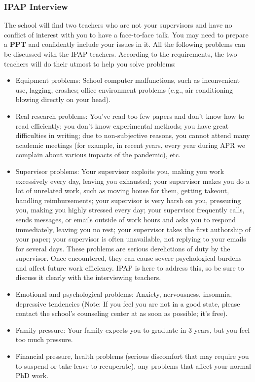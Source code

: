 \subsubsection{IPAP Interview}
\label{sec.IPAP}
The school will find two teachers who are not your supervisors and have no conflict of interest with you to have a face-to-face talk. You may need to prepare a \textbf{PPT} and confidently include your issues in it. All the following problems can be discussed with the IPAP teachers. According to the requirements, the two teachers will do their utmost to help you solve problems:
\begin{itemize}
    \item Equipment problems: School computer malfunctions, such as inconvenient use, lagging, crashes; office environment problems (e.g., air conditioning blowing directly on your head).
    \item Real research problems: You've read too few papers and don't know how to read efficiently; you don't know experimental methods; you have great difficulties in writing; due to non-subjective reasons, you cannot attend many academic meetings (for example, in recent years, every year during APR we complain about various impacts of the pandemic), etc.
    \item Supervisor problems: Your supervisor exploits you, making you work excessively every day, leaving you exhausted; your supervisor makes you do a lot of unrelated work, such as moving house for them, getting takeout, handling reimbursements; your supervisor is very harsh on you, pressuring you, making you highly stressed every day; your supervisor frequently calls, sends messages, or emails outside of work hours and asks you to respond immediately, leaving you no rest; your supervisor takes the first authorship of your paper; your supervisor is often unavailable, not replying to your emails for several days. These problems are serious derelictions of duty by the supervisor. Once encountered, they can cause severe psychological burdens and affect future work efficiency. IPAP is here to address this, so be sure to discuss it clearly with the interviewing teachers.
    \item Emotional and psychological problems: Anxiety, nervousness, insomnia, depressive tendencies (Note: If you feel you are not in a good state, please contact the school's counseling center at  as soon as possible; it's free).
    \item Family pressure: Your family expects you to graduate in 3 years, but you feel too much pressure.
    \item Financial pressure, health problems (serious discomfort that may require you to suspend or take leave to recuperate), any problems that affect your normal PhD work.
\end{itemize}

